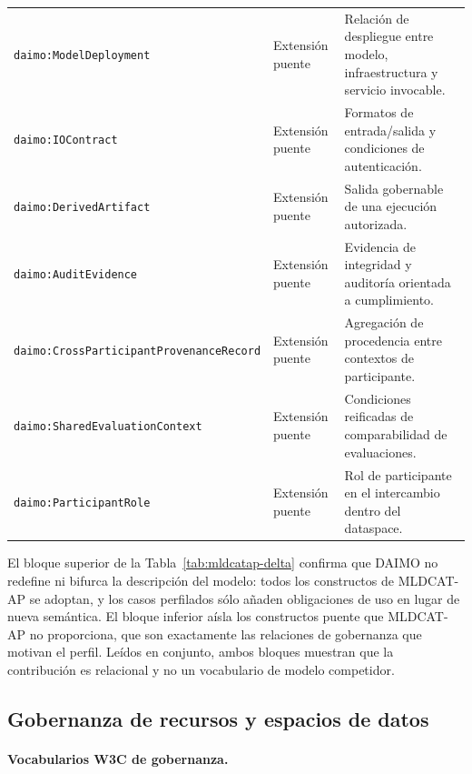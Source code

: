 \documentclass[Afour,sagev,times]{sagej}
\newcommand{\code}[1]{\texttt{#1}}
\begin{document}
\begin{table}[tb]
\begin{tabular}{@{}p{4.4cm}p{2.5cm}p{7.1cm}@{}}
\code{daimo:Model}\newline\code{Deployment} & Extensión puente & Relación de despliegue entre modelo, infraestructura y servicio invocable. \\
\code{daimo:IOContract} & Extensión puente & Formatos de entrada/salida y condiciones de autenticación. \\
\code{daimo:Derived}\newline\code{Artifact} & Extensión puente & Salida gobernable de una ejecución autorizada. \\
\code{daimo:AuditEvidence} & Extensión puente & Evidencia de integridad y auditoría orientada a cumplimiento. \\
\code{daimo:CrossParticipant}\newline\code{ProvenanceRecord} & Extensión puente & Agregación de procedencia entre contextos de participante. \\
\code{daimo:SharedEvaluation}\newline\code{Context} & Extensión puente & Condiciones reificadas de comparabilidad de evaluaciones. \\
\code{daimo:ParticipantRole} & Extensión puente & Rol de participante en el intercambio dentro del dataspace. \\
\bottomrule
\end{tabular}
\end{table}

El bloque superior de la Tabla~\ref{tab:mldcatap-delta} confirma que DAIMO no redefine ni bifurca la descripción del modelo: todos los constructos de MLDCAT-AP se adoptan, y los casos perfilados sólo añaden obligaciones de uso en lugar de nueva semántica. El bloque inferior aísla los constructos puente que MLDCAT-AP no proporciona, que son exactamente las relaciones de gobernanza que motivan el perfil. Leídos en conjunto, ambos bloques muestran que la contribución es relacional y no un vocabulario de modelo competidor.

\subsection{Gobernanza de recursos y espacios de datos}

\paragraph{Vocabularios W3C de gobernanza.}
\end{document}
